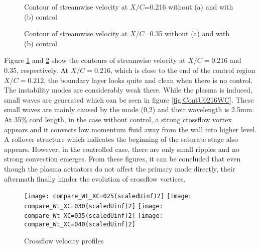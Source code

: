 \documentclass{AIAA}
\begin{document}
\begin{figure}
\centering
\subfigure[]{           %
\label{fig:ContU0216WOC} %
\texttt{[image: XC=0216(scaledUinf)WOC]}}
\subfigure[]{
\label{fig:ContU0216WC} %
\texttt{[image: XC=0216(scaledUinf)WC]}}
\caption{Contour of streamwise velocity at $X/C$=0.216 without (a) and with (b) control}
\label{fig:ContU0216} %
\end{figure}

\begin{figure}
\centering
\subfigure[]{           %
\label{fig:ContU0350WOC} %
\texttt{[image: XC=035(scaledUinf)WOC]}}
\subfigure[]{
\label{fig:ContU0350WC} %
\texttt{[image: XC=035(scaledUinf)WC]}}
\caption{Contour of streamwise velocity at $X/C$=0.35 without (a) and with (b) control}
\label{fig:ContU0350} %
\end{figure}
\clearpage %
Figure \ref{fig:ContU0216} and \ref{fig:ContU0350} show the contours of streamwise velocity at $X/C=0.216$ and 0.35, respectively. At $X/C=0.216$, which is close to the end of the control region $X/C=0.212$, the boundary layer looks quite and clean when there is no control. The instability modes are considerably weak there. While the plasma is induced, small waves are generated which can be seen in figure \ref{fig:ContU0216WC}. These small waves are mainly caused by the mode (0,2) and their wavelength is 2.5mm. At 35\% cord length, in the case without control, a strong crossflow vortex appears and it convects low momentum fluid away from the wall into higher level. A rollover structure which indicates the beginning of the saturate stage also appears. However, in the controlled case, there are only small ripples and no strong convection emerges. From these figures, it can be concluded that even though the plasma actuators do not affect the primary mode directly, their aftermath finally hinder the evolution of crossflow vortices.
\begin{figure}
\centering
\texttt{[image: compare\_Wt\_XC=025(scaledUinf)2]}
\texttt{[image: compare\_Wt\_XC=030(scaledUinf)2]}
\texttt{[image: compare\_Wt\_XC=035(scaledUinf)2]}
\texttt{[image: compare\_Wt\_XC=040(scaledUinf)2]}
\caption{Crossflow velocity profiles}%
\label{f:CFprofiles}
\end{figure}
\end{document}
